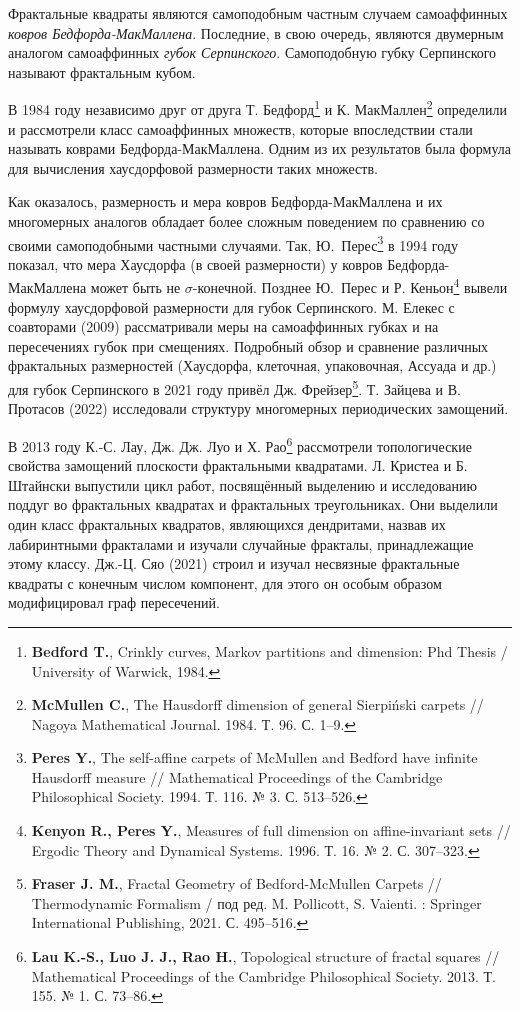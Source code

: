 \documentclass[a5paper,9pt,twoside]{extarticle} %
\begin{document}
Фрактальные квадраты являются самоподобным частным случаем самоаффинных {\em ковров Бедфорда-МакМаллена}.
Последние, в свою очередь, являются двумерным аналогом самоаффинных {\em губок Серпинского}.
Самоподобную губку Серпинского называют фрактальным кубом.

В 1984 году независимо друг от друга Т. Бедфорд\footnote{{\bf Bedford T.}, Crinkly curves, Markov partitions and dimension: Phd Thesis / University of Warwick, 1984.} и К. МакМаллен\footnote{{\bf McMullen C.}, The Hausdorff dimension of general Sierpiński carpets // Nagoya Mathematical Journal. 1984. Т. 96. С. 1–9.} определили и рассмотрели класс самоаффинных множеств, которые впоследствии стали называть коврами Бедфорда-МакМаллена.
Одним из их результатов была формула для вычисления хаусдорфовой размерности таких множеств.

Как оказалось, размерность и мера ковров Бедфорда-\linebreak МакМаллена и их многомерных аналогов обладает более сложным поведением по сравнению со своими самоподобными частными случаями.
Так, Ю.~Перес\footnote{{\bf Peres Y.}, The self-affine carpets of McMullen and Bedford have infinite Hausdorff measure // Mathematical Proceedings of the Cambridge Philosophical Society. 1994. Т. 116. № 3. С. 513--526.} в 1994 году показал, что мера Хаусдорфа (в своей размерности) у ковров Бедфорда-МакМал\-ле\-на может быть не $\sigma$-конечной.
Позднее Ю.~Перес и Р. Кеньон\footnote{{\bf Kenyon R., Peres Y.}, Measures of full dimension on affine-invariant sets // Ergodic Theory and Dynamical Systems. 1996. Т. 16. № 2. С. 307--323.} вывели формулу хаусдорфовой размерности для губок Серпинского.
М. Елекес с соавторами (2009) рассматривали меры на самоаффинных губках и на пересечениях губок при смещениях.
Подробный обзор и сравнение различных фрактальных размерностей (Хаусдорфа, клеточная, упаковочная, Ассуада и др.) для губок Серпинского в 2021 году привёл Дж. Фрейзер\footnote{{\bf Fraser J. M.}, Fractal Geometry of Bedford-McMullen Carpets // Thermodynamic Formalism / под ред. M. Pollicott, S. Vaienti. : Springer International Publishing, 2021. С. 495--516.}.
Т. Зайцева и В. Протасов (2022) исследовали структуру многомерных периодических замощений.

В 2013 году К.-С. Лау, Дж. Дж. Луо и Х. Рао\footnote{{\bf Lau K.-S., Luo J. J., Rao H.}, Topological structure of fractal squares // Mathematical Proceedings of the Cambridge Philosophical Society. 2013. Т. 155. № 1. С. 73--86.} рассмотрели топологические свойства замощений плоскости фрактальными квадратами.
Л. Кристеа и Б. Штайнски выпустили цикл работ, посвящённый выделению и исследованию поддуг во фрактальных квадратах и фрактальных треугольниках.
Они выделили один класс фрактальных квадратов, являющихся дендритами, назвав их лабиринтными фракталами и изучали случайные фракталы, принадлежащие этому классу.
Дж.-Ц. Сяо (2021) строил и изучал несвязные фрактальные квадраты с конечным числом компонент, для этого он особым образом модифицировал граф пересечений.
\end{document}
